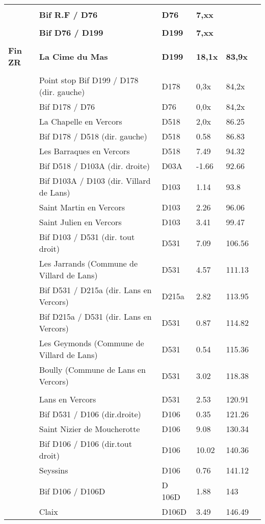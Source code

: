 \documentclass{article}%
\begin{document}
\begin{longtable}{p{2.25cm}|p{6.7cm}|p{2.0cm}|p{1.5cm}|p{1.5cm}|p{3.5cm}}
 & & & & & \\%
 &\textbf{Bif R.F / D76}&\textbf{D76}&\textbf{7,xx}& & \\%
 & & & & & \\%
 &\textbf{Bif D76 / D199}&\textbf{D199}&\textbf{7,xx}& & \\%
 & & & & & \\%
\textbf{Fin ZR }&\textbf{La Cime du Mas}&\textbf{D199}&\textbf{18,1x}&\textbf{83,9x}& \\%
 & & & & & \\%
 &Point stop Bif D199 / D178 (dir. gauche)&D178&0,3x&84,2x& \\%
 &Bif D178 / D76 &D76&0,0x&84,2x& \\%
 &La Chapelle en Vercors&D518&2,0x&86.25& \\%
 &Bif D178 / D518 (dir. gauche)&D518&0.58&86.83& \\%
 &Les Barraques en Vercors&D518&7.49&94.32& \\%
 &Bif D518 / D103A (dir. droite)&D03A&-1.66&92.66& \\%
 &Bif D103A / D103  (dir. Villard de Lans)&D103 &1.14&93.8& \\%
 &Saint Martin en Vercors&D103&2.26&96.06& \\%
 &Saint Julien en Vercors&D103&3.41&99.47& \\%
 &Bif D103 / D531 (dir. tout droit)&D531&7.09&106.56& \\%
 &Les Jarrands (Commune de Villard de Lans)&D531&4.57&111.13& \\%
 &Bif D531 / D215a (dir. Lans en Vercors)&D215a&2.82&113.95& \\%
 &Bif D215a / D531 (dir. Lans en Vercors)&D531&0.87&114.82& \\%
 &Les Geymonds (Commune de Villard de Lans)&D531&0.54&115.36& \\%
 &Boully (Commune de Lans en Vercors)&D531&3.02&118.38& \\%
\hline& & & & & \\%
 &Lans en Vercors&D531&2.53&120.91& \\%
 &Bif D531 / D106 (dir.droite)&D106&0.35&121.26& \\%
 &Saint Nizier de Moucherotte&D106&9.08&130.34& \\%
 &Bif D106 / D106 (dir.tout droit)&D106&10.02&140.36& \\%
 &Seyssins&D106&0.76&141.12& \\%
 &Bif D106 / D106D&D 106D&1.88&143& \\%
 &Claix&D106D&3.49&146.49& \\%

\end{longtable}
\end{document}
